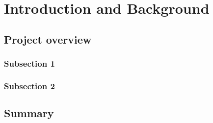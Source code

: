 %
%
%

\chapter{Introduction and Background}
\label{chap:intro}


\section{Project overview}

  \subsection{Subsection 1}

  \subsection{Subsection 2}

\section{Summary}

